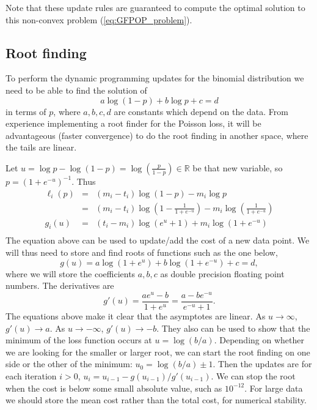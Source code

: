 \documentclass[12pt]{article}
\newcommand{\RR}{\mathbb R}
\begin{document}
Note that these update rules are guaranteed to compute the optimal
solution to this non-convex problem (\ref{eq:GFPOP_problem}).
 
\subsection{Root finding}

To perform the dynamic programming updates for the binomial
distribution we need to be able to find the solution of
\begin{equation}
  \label{eq:pDPA-intervals}
  a \log(1-p) + b \log p + c = d
\end{equation}
in terms of $p$, where $a,b,c,d$ are constants which depend on the
data. From experience implementing a root finder for the Poisson loss,
it will be advantageous (faster convergence) to do the root finding in
another space, where the tails are linear.

Let $u=\log p - \log(1-p) = \log(\frac{p}{1-p})\in\RR$ be that new
variable, so $p=(1+e^{-u})^{-1}$. Thus
\begin{eqnarray*}
  \ell_i(p) 
  &=& (m_i - t_i) \log(1-p) - m_i\log p \\
  &=& (m_i - t_i) \log(1-\frac{1}{1+e^{-u}}) - m_i\log(\frac{1}{1+e^{-u}})\\
g_i(u)  &=& (t_i - m_i) \log(e^u+1) + m_i\log(1+e^{-u}) \\
\end{eqnarray*}
The equation above can be used to update/add the cost of a new data
point. We will thus need to store and find roots of functions such as
the one below, 
\begin{equation}
  \label{eq:g(u)}
  g(u)=a\log(1+e^u)+b\log(1+e^{-u})+c=d,
\end{equation}
where we will store the coefficients $a,b,c$ as double
precision floating point numbers. The derivatives are
\begin{equation}
  \label{eq:g'(u)}
  g'(u)=\frac{ae^u - b}{1+e^u} = \frac{a-be^{-u}}{e^{-u}+1}.
\end{equation}
The equations above make it clear that the asymptotes are linear. As
$u\rightarrow\infty$, $g'(u)\rightarrow a$. As $u\rightarrow -\infty$,
$g'(u)\rightarrow -b$. They also can be used to show that the minimum
of the loss function occurs at $u=\log(b/a)$.  Depending on whether we
are looking for the smaller or larger root, we can start the root
finding on one side or the other of the minimum:
$u_0 = \log(b/a)\pm 1$. Then the updates are for each iteration $i>0$,
$u_i = u_{i-1} - g(u_{i-1})/g'(u_{i-1})$. We can stop the root when
the cost is below some small absolute value, such as $10^{-12}$. For
large data we should store the mean cost rather than the total cost,
for numerical stability.
\end{document}
